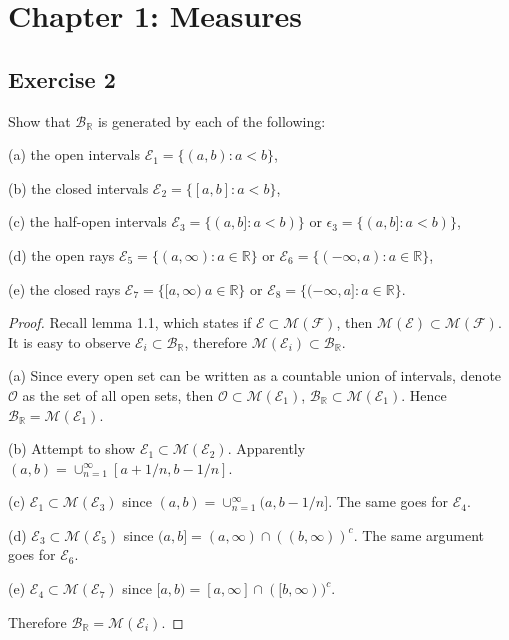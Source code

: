 \section{Chapter 1: Measures}
\subsection*{Exercise 2}
Show that $\mathcal{B}_\mathbb{R}$ is generated by each of the following:
\par(a) the open intervals $\mathcal{E}_1=\{(a,b):a<b\}$,
\par(b) the closed intervals $\mathcal{E}_2=\{[a,b]:a<b\}$,
\par(c) the half-open intervals $\mathcal{E}_3=\{(a,b]:a<b)\}$ or $\epsilon_3=\{(a,b]:a<b)\}$,
\par(d) the open rays $\mathcal{E}_5=\{(a,\infty):a\in\mathbb{R}\}$ or $\mathcal{E}_6=\{(-\infty,a):a\in\mathbb{R}\}$,
\par(e) the closed rays $\mathcal{E}_7=\{[a,\infty)\:a\in\mathbb{R}\}$ or $\mathcal{E}_8=\{(-\infty,a]:a\in\mathbb{R}\}$.
\begin{proof}
    Recall lemma 1.1, which states if $\mathcal{E}\subset\mathcal{M}(\mathcal{F})$, then $\mathcal{M}(\mathcal{E})\subset\mathcal{M}(\mathcal{F})$. It is easy to observe $\mathcal{E}_i\subset\mathcal{B}_\mathbb{R}$, therefore $\mathcal{M}(\mathcal{E}_i)\subset\mathcal{B}_\mathbb{R}$.
    \par(a) Since every open set can be written as a countable union of intervals, denote $\mathcal{O}$ as the set of all open sets, then $\mathcal{O}\subset\mathcal{M}(\mathcal{E}_1)$, $\mathcal{B}_\mathbb{R}\subset\mathcal{M}(\mathcal{E}_1)$. Hence $\mathcal{B}_\mathbb{R}=\mathcal{M}(\mathcal{E}_1)$.
    \par(b) Attempt to show $\mathcal{E}_1\subset\mathcal{M}(\mathcal{E}_2)$. Apparently $(a,b)=\cup_{n=1}^{\infty}[a+1/n,b-1/n]$.
    \par(c) $\mathcal{E}_1\subset\mathcal{M}(\mathcal{E}_3)$ since $(a,b)=\cup_{n=1}^{\infty}(a,b-1/n]$. The same goes for $\mathcal{E}_4$.
    \par(d) $\mathcal{E}_3\subset\mathcal{M}(\mathcal{E}_5)$ since $(a,b]=(a,\infty)\cap((b,\infty))^c$. The same argument goes for $\mathcal{E}_6$.
    \par(e) $\mathcal{E}_4\subset\mathcal{M}(\mathcal{E}_7)$ since $[a,b)=[a,\infty]\cap([b,\infty))^c$.
    \par Therefore $\mathcal{B}_\mathbb{R}=\mathcal{M}(\mathcal{E}_i)$.
\end{proof}
